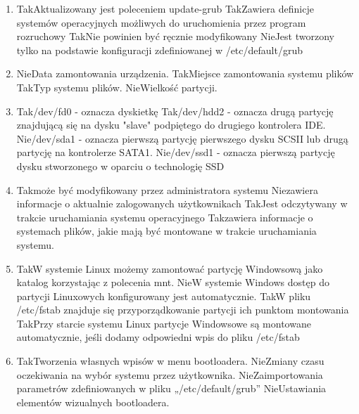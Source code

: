 \begin{enumerate}
	\item {}
	{Tak}{Aktualizowany jest poleceniem update-grub}
	{Tak}{Zawiera definicje systemów operacyjnych możliwych do uruchomienia przez program rozruchowy}
	{Tak}{Nie powinien być ręcznie modyfikowany}
	{Nie}{Jest tworzony tylko na podstawie konfiguracji zdefiniowanej w /etc/default/grub}
	
	\newpage
	
	\item {}
	{Nie}{Data zamontowania urządzenia.}
	{Tak}{Miejsce zamontowania systemu plików}
	{Tak}{Typ systemu plików.}
	{Nie}{Wielkość partycji.}

	\item {}
	{Tak}{/dev/fd0 - oznacza dyskietkę}
	{Tak}{/dev/hdd2 - oznacza drugą partycję znajdującą się na dysku "slave" podpiętego do drugiego kontrolera IDE.}
	{Nie}{/dev/sda1 - oznacza pierwszą partycję pierwszego dysku SCSII lub drugą partycję na kontrolerze SATA1.}
	{Nie}{/dev/ssd1 - oznacza pierwszą partycję dysku stworzonego w oparciu o technologię SSD}
	
	\item {}
	{Tak}{może być modyfikowany przez administratora systemu}
	{Nie}{zawiera informacje o aktualnie zalogowanych użytkownikach}
	{Tak}{Jest odczytywany w trakcie uruchamiania systemu operacyjnego}
	{Tak}{zawiera informacje o systemach plików, jakie mają być montowane w trakcie uruchamiania systemu.}
	
	\item {}%
	{Tak}{W systemie Linux możemy zamontować partycję Windowsową jako katalog korzystając z polecenia mnt.}%
	{Nie}{W systemie Windows dostęp do partycji Linuxowych konfigurowany jest automatycznie.}%
	{Tak}{W pliku /etc/fstab znajduje się przyporządkowanie partycji ich punktom montowania}%
	{Tak}{Przy starcie systemu Linux partycje Windowsowe są montowane automatycznie, jeśli dodamy odpowiedni wpis do pliku /etc/fstab}
	
	\item {}%
	{Tak}{Tworzenia własnych wpisów w menu bootloadera.}%
	{Nie}{Zmiany czasu oczekiwania na wybór systemu przez użytkownika.}%
	{Nie}{Zaimportowania parametrów zdefiniowanych w pliku „/etc/default/grub”}%
	{Nie}{Ustawiania elementów wizualnych bootloadera.}


\end{enumerate}
